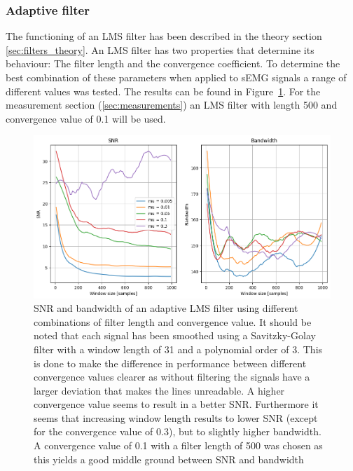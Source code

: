 \subsubsection{Adaptive filter}
The functioning of an LMS filter has been described in the theory section \ref{sec:filters_theory}. An LMS filter has two properties that determine its behaviour: The filter length and the convergence coefficient. To determine the best combination of these parameters when applied to sEMG signals a range of different values was tested. The results can be found in Figure~\ref{fig:lms_filter_windowsize}. For the measurement section (\ref{sec:measurements}) an LMS filter with length 500 and convergence value of 0.1 will be used.

\begin{figure}[h!t]
	\begin{center}
		\includegraphics[width=1.0\columnwidth]{images/lms_filter_windowsize.png}
	\end{center}
	\caption{SNR and bandwidth of an adaptive LMS filter using different combinations of filter length and convergence value. It should be noted that each signal has been smoothed using a Savitzky-Golay filter with a window length of 31 and a polynomial order of 3. This is done to make the difference in performance between different convergence values clearer as without filtering the signals have a larger deviation that makes the lines unreadable. A higher convergence value seems to result in a better SNR. Furthermore it seems that increasing window length results to lower SNR (except for the convergence value of 0.3), but to slightly higher bandwidth. A convergence value of 0.1 with a filter length of 500 was chosen as this yields a good middle ground between SNR and bandwidth}
	\label{fig:lms_filter_windowsize}
\end{figure}


